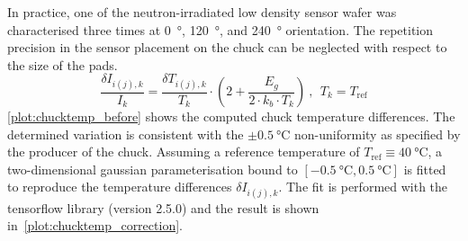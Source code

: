 In practice, one of the neutron-irradiated low density sensor wafer was characterised three times at \SI{0}{\degree}, \SI{120}{\degree}, and \SI{240}{\degree} orientation.
The repetition precision in the sensor placement on the chuck can be neglected with respect to the size of the pads. 
\begin{equation}
    \frac{\delta I_{i(j),k}}{I_k} = \frac{\delta T_{i(j), k}}{T_k} \cdot \left(2 + \frac{E_g}{2\cdot k_b \cdot T_k} \right)~,~~T_k = T_\text{ref}
    \label{eq:temp_diff}
\end{equation}
\ref{plot:chucktemp_before} shows the computed chuck temperature differences.
The determined variation is consistent with the $\pm\SI{0.5}{\celsius}$ non-uniformity as specified by the producer of the chuck.
Assuming a reference temperature of $T_\text{ref}\equiv\SI{40}{\celsius}$, a two-dimensional gaussian parameterisation bound to $[\SI{-0.5}{\celsius}, \SI{0.5}{\celsius}]$ is fitted to reproduce the temperature differences $\delta I_{i(j),k}$.
The fit is performed with the tensorflow library (version 2.5.0) and the result is shown in~\ref{plot:chucktemp_correction}.
